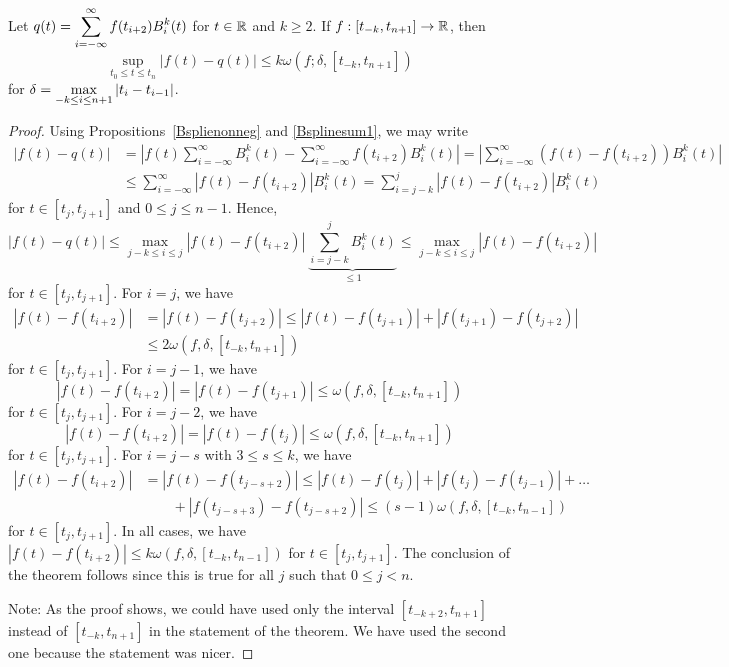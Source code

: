 \begin{theorem}
Let $\displaystyle q(t) = \sum_{i=-\infty}^\infty f(t_{i+2}) B_i^k(t)$ for
$t\in \mathbb{R}$ and $k\geq 2$.  If $f:[t_{-k},t_{n+1}] \to \mathbb{R}$, then 
\[
  \sup_{t_0 \leq t\leq t_n} |f(t) - q(t)|
  \leq k \omega(f; \delta, [t_{-k},t_{n+1}])
\]
for $\displaystyle \delta = \max_{-k\leq i \leq n+1} |t_i - t_{i-1}|$.
\label{SplineApprox}
\end{theorem}

\begin{proof}
Using Propositions~\ref{Bsplienonneg} and \ref{Bsplinesum1}, we may write
\begin{align*}
|f(t) - q(t)| &= \left| f(t) \sum_{i=-\infty}^\infty B_i^k(t)
- \sum_{i=-\infty}^\infty f(t_{i+2})B_i^k(t) \right|
= \left| \sum_{i=-\infty}^\infty \left( f(t) - f(t_{i+2})\right) B_i^k(t)
\right| \\
&\leq \sum_{i=-\infty}^\infty \left| f(t) - f(t_{i+2})\right| B_i^k(t)
= \sum_{i=j-k}^j \left| f(t) - f(t_{i+2})\right| B_i^k(t)
\end{align*}
for $t \in [t_j,t_{j+1}]$ and $0 \leq j \leq n-1$.  Hence,
\[
|f(t) - q(t)|
\leq \max_{j-k \leq i \leq j} \left| f(t) - f(t_{i+2})\right|
\  \underbrace{\sum_{i=j-k}^j B_i^k(t)}_{\leq 1}
\leq \max_{j-k \leq i \leq j}  \left| f(t) - f(t_{i+2})\right|
\]
for $t \in [t_j,t_{j+1}]$.
For $i = j$, we have
\begin{align*}
\left| f(t) - f(t_{i+2})\right|
&= \left| f(t) - f(t_{j+2})\right|
\leq \left| f(t) - f(t_{j+1})\right| + \left| f(t_{j+1}) - f(t_{j+2})\right| \\
&\leq 2 \omega(f, \delta, [t_{-k},t_{n+1}])
\end{align*}
for $t \in [t_j,t_{j+1}]$.  For $i = j-1$, we have
\[
\left| f(t) - f(t_{i+2})\right|
= \left| f(t) - f(t_{j+1})\right|
\leq \omega(f, \delta, [t_{-k},t_{n+1}])
\]
for $t \in [t_j,t_{j+1}]$.  For $i = j-2$, we have
\[
\left| f(t) - f(t_{i+2})\right|
= \left| f(t) - f(t_j)\right| \leq \omega(f, \delta, [t_{-k},t_{n+1}])
\]
for $t \in [t_j,t_{j+1}]$.  For $i = j-s$ with $3\leq s \leq k$, we have
\begin{align*}
\left| f(t) - f(t_{i+2})\right|
&= \left| f(t) - f(t_{j-s+2})\right|
\leq \left| f(t) - f(t_j)\right| + \left| f(t_j) - f(t_{j-1})\right| + \ldots \\
&\qquad + \left| f(t_{j-s+3}) - f(t_{j-s+2})\right|
\leq (s-1) \omega(f, \delta, [t_{-k},t_{n-1}])
\end{align*}
for $t \in [t_j,t_{j+1}]$.  In all cases, we have
$\left| f(t) - f(t_{i+2})\right| \leq k \omega(f, \delta, [t_{-k},t_{n-1}])$
for $t \in [t_j,t_{j+1}]$.  The conclusion of the theorem follows
since this is true for all $j$ such that $0 \leq j < n$.

\noindent Note: As the proof shows, we could have used only the
interval $[t_{-k+2},t_{n+1}]$ instead of $[t_{-k},t_{n+1}]$ in the
statement of the theorem.  We have used the second one because the
statement was nicer.
\end{proof}


